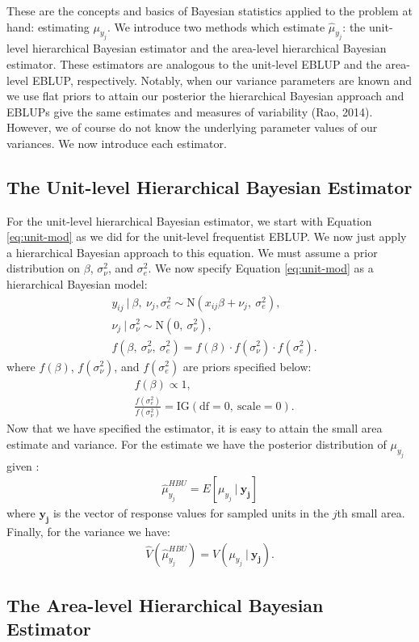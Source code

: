 \documentclass[12pt,twoside]{reedthesis}
\begin{document}
These are the concepts and basics of Bayesian statistics applied to the problem at hand: estimating \(\mu_{y_j}\). We introduce two methods which estimate \(\hat\mu_{y_j}\): the unit-level hierarchical Bayesian estimator and the area-level hierarchical Bayesian estimator. These estimators are analogous to the unit-level EBLUP and the area-level EBLUP, respectively. Notably, when our variance parameters are known and we use flat priors to attain our posterior the hierarchical Bayesian approach and EBLUPs give the same estimates and measures of variability (Rao, 2014). However, we of course do not know the underlying parameter values of our variances. We now introduce each estimator.

\hypertarget{the-unit-level-hierarchical-bayesian-estimator}{%
\subsection{The Unit-level Hierarchical Bayesian Estimator}\label{the-unit-level-hierarchical-bayesian-estimator}}

For the unit-level hierarchical Bayesian estimator, we start with Equation \eqref{eq:unit-mod} as we did for the unit-level frequentist EBLUP. We now just apply a hierarchical Bayesian approach to this equation. We must assume a prior distribution on \(\beta\), \(\sigma^2_\nu\), and \(\sigma^2_e\). We now specify Equation \eqref{eq:unit-mod} as a hierarchical Bayesian model:
\begin{align}
&y_{ij} ~\vert~ \beta,~ \nu_j, \sigma^2_e \sim \text{N}(x_{ij}\beta + \nu_j,~ \sigma^2_e), \nonumber \\
&\nu_j ~\vert~ \sigma^2_\nu \sim \text{N}(0,~ \sigma^2_\nu),\nonumber \\
&f(\beta,~ \sigma^2_\nu, ~\sigma^2_e) = f(\beta)\cdot f(\sigma^2_\nu) \cdot f(\sigma^2_e).
\end{align}
where \(f(\beta)\), \(f(\sigma^2_\nu)\), and \(f(\sigma^2_e)\) are priors specified below:
\begin{align*}
&f(\beta) \propto 1, \\
&\frac{f(\sigma^2_e)}{f(\sigma^2_\nu)} = \text{IG}(\text{df} = 0,~ \text{scale} = 0).
\end{align*}
Now that we have specified the estimator, it is easy to attain the small area estimate and variance. For the estimate we have the posterior distribution of \(\mu_{y_j}\) given :
\begin{align}
\hat\mu_{y_j}^{HBU} = E[\mu_{y_j} ~\vert~ \mathbf{y_j}]
\end{align}
where \(\mathbf{y_j}\) is the vector of response values for sampled units in the \(j\)th small area. Finally, for the variance we have:
\begin{align}
\hat V(\hat \mu_{y_j}^{HBU}) = V(\mu_{y_j} ~\vert~ \mathbf{y_j}).
\end{align}
\hypertarget{the-area-level-hierarchical-bayesian-estimator}{%
\subsection{The Area-level Hierarchical Bayesian Estimator}\label{the-area-level-hierarchical-bayesian-estimator}}
\end{document}
